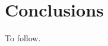 \documentclass[fleqn,usenatbib]{mnras}
\begin{document}
\section{Conclusions}
\label{sec:conclusions}

To follow.










%




\bsp	%
\label{lastpage}
\end{document}
